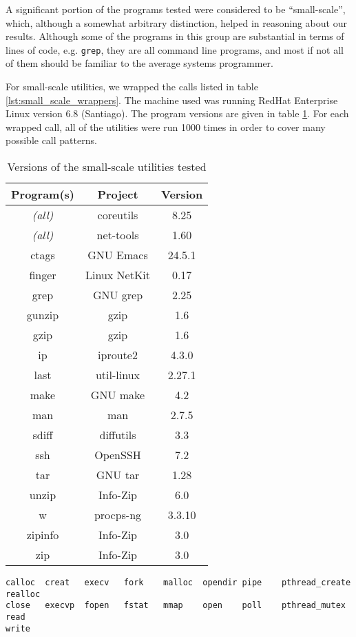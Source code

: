 A significant portion of the programs tested were considered to be ``small-scale'', which, although a somewhat arbitrary distinction, helped in reasoning about our results. Although some of the programs in this group are substantial in terms of lines of code, e.g. \texttt{grep}, they are all command line programs, and most if not all of them should be familiar to the average systems programmer.

For small-scale utilities, we wrapped the calls listed in table \ref{lst:small_scale_wrappers}. The machine used was running RedHat Enterprise Linux version 6.8 (Santiago). The program versions are given in table \ref{tab:small_scale_versions}. For each wrapped call, all of the utilities were run 1000 times in order to cover many possible call patterns.

\begin{table}[h!]
\begin{center}
\begin{tabular}{ |c|c|c| }
\hline
\multicolumn{1}{|c|}{\textbf{Program(s)}} & \multicolumn{1}{c|}{\textbf{Project}} & \multicolumn{1}{c|}{\textbf{Version}} \\
\hline
\em{(all)} & coreutils  & 8.25 \\ 
\hline
\em{(all)} & net-tools & 1.60 \\
\hline
ctags&GNU Emacs & 24.5.1 \\
finger&Linux NetKit  & 0.17 \\
grep & GNU grep & 2.25 \\
gunzip & gzip & 1.6 \\
gzip & gzip & 1.6 \\
ip&iproute2 & 4.3.0 \\
last & util-linux & 2.27.1 \\
make & GNU make & 4.2 \\
man & man & 2.7.5 \\
sdiff&diffutils & 3.3 \\
ssh&OpenSSH & 7.2 \\
tar&GNU tar & 1.28 \\
unzip&Info-Zip  & 6.0 \\
w&procps-ng & 3.3.10 \\
zipinfo&Info-Zip & 3.0 \\
zip&Info-Zip & 3.0 \\
\hline
\end{tabular}
\caption{Versions of the small-scale utilities tested}
\label{tab:small_scale_versions}
\end{center}
\end{table}

\PreTable
\begin{lstlisting}[captionpos=b, label={lst:small_scale_wrappers},caption={Wrapped calls for testing small-scale utilities}]
calloc  creat   execv   fork    malloc  opendir pipe    pthread_create 	realloc
close   execvp  fopen   fstat   mmap    open    poll    pthread_mutex	read    
write
\end{lstlisting}
\PostTable
